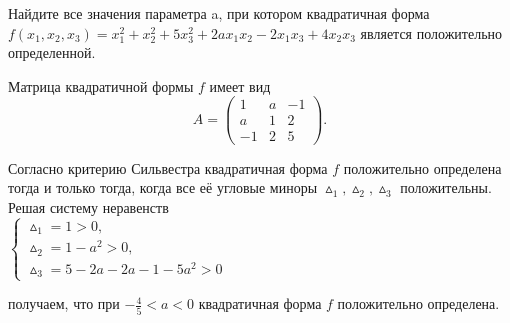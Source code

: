 \documentclass[addpoints, answers]{exam} %
\begin{document}
\begin{questions}

\question	Найдите все значения параметра a, при котором квадратичная форма\\  $f (x_1, x_2, x_3)=x_1^2+x_2^2+5x_3^2+2ax_1x_2-2x_1x_3+4x_2x_3$ 
является положительно определенной.

\begin{solution}
Матрица квадратичной формы  $f$ имеет вид\\
\[
 A=\left(\begin{array}{ccc}
1 & a & -1\\
a & 1 & 2\\
-1 & 2 & 5
\end{array}\right).
\]

Согласно критерию Сильвестра квадратичная форма  $f$ положительно определена тогда и только тогда, когда все её угловые миноры  $\vartriangle_1,\vartriangle_2,\vartriangle_3$   положительны. Решая систему неравенств\\
$
\begin{cases}
\vartriangle_1=1>0,\\
\vartriangle_2=1-a^2>0,\\
\vartriangle_3=5-2a-2a-1-5a^2>0
\end{cases}
$
 
получаем, что при $-\frac45<a<0$  квадратичная форма  $f$ положительно определена. 


\end{solution}
\end{questions}
\end{document}
